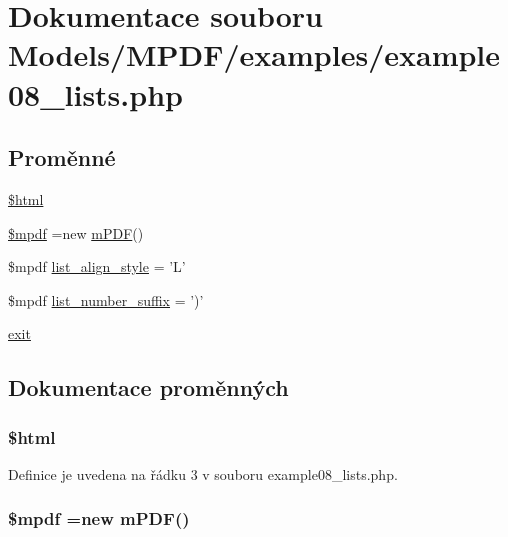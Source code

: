 \hypertarget{example08__lists_8php}{\section{Dokumentace souboru Models/\-M\-P\-D\-F/examples/example08\-\_\-lists.php}
\label{example08__lists_8php}
}
\subsection*{Proměnné}
\begin{DoxyCompactItemize}
\item 
\hyperlink{example08__lists_8php_a6f96e7fc92441776c9d1cd3386663b40}{\$html}
\item 
\hyperlink{example08__lists_8php_ad028f81910d6cbab9b184d2214b3a8f8}{\$mpdf} =new \hyperlink{classm_p_d_f}{m\-P\-D\-F}()
\item 
\$mpdf \hyperlink{example08__lists_8php_ae723aa964527bc114be3010e4a15c7fb}{list\-\_\-align\-\_\-style} = 'L'
\item 
\$mpdf \hyperlink{example08__lists_8php_a0e143fd6cd1ed977446f3abf05380031}{list\-\_\-number\-\_\-suffix} = ')'
\item 
\hyperlink{example08__lists_8php_a6733eb5f605d09eaede9845835d71c4e}{exit}
\end{DoxyCompactItemize}


\subsection{Dokumentace proměnných}
\hypertarget{example08__lists_8php_a6f96e7fc92441776c9d1cd3386663b40}{
\subsubsection[{\$html}]{\setlength{\rightskip}{0pt plus 5cm}\$html}}\label{example08__lists_8php_a6f96e7fc92441776c9d1cd3386663b40}


Definice je uvedena na řádku 3 v souboru example08\-\_\-lists.\-php.

\hypertarget{example08__lists_8php_ad028f81910d6cbab9b184d2214b3a8f8}{
\subsubsection[{\$mpdf}]{\setlength{\rightskip}{0pt plus 5cm}\$mpdf =new {\bf m\-P\-D\-F}()}}\label{example08__lists_8php_ad028f81910d6cbab9b184d2214b3a8f8}



